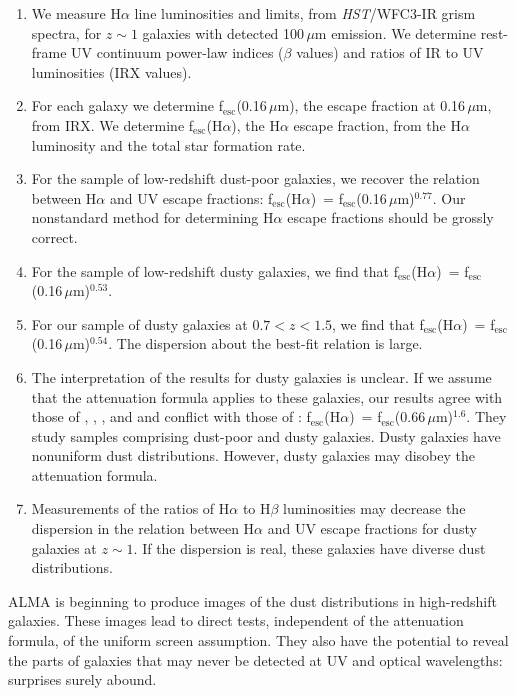 \documentclass[referee]{aa}
\newcommand{\alephuv}{f$_{\mathrm{esc}}$(0.16$\,\mu$m)}
\newcommand{\alephha}{f$_{\mathrm{esc}}$(H$\alpha$)}
\newcommand{\alephuvha}{f$_{\mathrm{esc}}$(0.66$\,\mu$m)}
\begin{document}
\begin{enumerate}
\item We measure H$\alpha$ line luminosities and limits, from
\emph{HST}/WFC3-IR grism spectra, for $z \sim 1$ galaxies with detected
100$\,\mu$m emission.  We determine rest-frame UV continuum power-law
indices ($\beta$ values) and ratios of IR to UV luminosities (IRX values).
\item For each galaxy we determine \alephuv, the escape fraction at
0.16$\,\mu$m, from IRX.  We determine \alephha, the H$\alpha$ escape
fraction, from the H$\alpha$ luminosity and the total star formation rate.
\item For the \citet{overzier11} sample of low-redshift dust-poor galaxies, we
recover the \citet{calzetti97b} relation between H$\alpha$ and UV escape
fractions: \alephha~= \alephuv$^{0.77}$.  Our nonstandard method for determining
H$\alpha$ escape fractions should be grossly correct.
\item For the \citet{hwang13} sample of low-redshift dusty galaxies, we find
that \alephha~= \alephuv$^{0.53}$.
\item For our sample of dusty galaxies at $0.7 < z < 1.5$, we find that
\alephha~= \alephuv$^{0.54}$.  The dispersion about the best-fit relation is
large.
\item The interpretation of the results for dusty galaxies is unclear.  If we
assume that the \citet{calzetti00} attenuation formula applies to these
galaxies, our results agree with those of \citet{onodera10}, \citet{kashino13},
\citet{price13}, and \citet{reddy15} and conflict with those of \citet{erb06}: \alephha~=
\alephuvha$^{1.6}$.  They study
samples comprising dust-poor and dusty galaxies.  Dusty galaxies have
nonuniform dust distributions.  However, dusty galaxies may disobey the
\citet{calzetti00} attenuation formula.
\item Measurements of the ratios of H$\alpha$ to H$\beta$ luminosities may
decrease the dispersion in the relation between H$\alpha$ and UV escape
fractions for dusty galaxies at $z \sim 1$.  If the dispersion is real, these
galaxies have diverse dust distributions.
\end{enumerate}

ALMA is beginning to produce images of the dust distributions in high-redshift
galaxies.  These images lead to direct tests, independent of the attenuation
formula, of the uniform screen assumption.  They also have the potential to
reveal the parts of galaxies that may never be detected at UV and optical
wavelengths: surprises surely abound.
\end{document}
